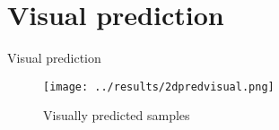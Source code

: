 \section{Visual prediction}

\begin{frame}{Visual prediction}
  \begin{figure}[!htbp]
    \centering
    \small{\caption{Visually predicted samples}}
    \texttt{[image: ../results/2dpredvisual.png]}
  \end{figure}
\end{frame}
